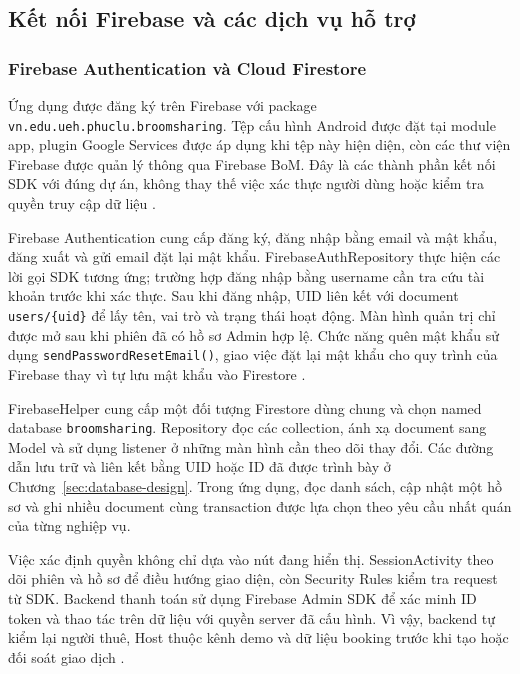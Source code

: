 \subsection{Kết nối Firebase và các dịch vụ hỗ trợ}
\label{sec:firebase-and-services}

\subsubsection{Firebase Authentication và Cloud Firestore}
Ứng dụng được đăng ký trên Firebase với package \texttt{vn.edu.ueh.phuclu.broomsharing}. Tệp cấu hình Android được đặt tại module app, plugin Google Services được áp dụng khi tệp này hiện diện, còn các thư viện Firebase được quản lý thông qua Firebase BoM. Đây là các thành phần kết nối SDK với đúng dự án, không thay thế việc xác thực người dùng hoặc kiểm tra quyền truy cập dữ liệu \parencite{firebase_android}.

Firebase Authentication cung cấp đăng ký, đăng nhập bằng email và mật khẩu, đăng xuất và gửi email đặt lại mật khẩu. FirebaseAuthRepository thực hiện các lời gọi SDK tương ứng; trường hợp đăng nhập bằng username cần tra cứu tài khoản trước khi xác thực. Sau khi đăng nhập, UID liên kết với document \texttt{users/\{uid\}} để lấy tên, vai trò và trạng thái hoạt động. Màn hình quản trị chỉ được mở sau khi phiên đã có hồ sơ Admin hợp lệ. Chức năng quên mật khẩu sử dụng \texttt{sendPasswordResetEmail()}, giao việc đặt lại mật khẩu cho quy trình của Firebase thay vì tự lưu mật khẩu vào Firestore \parencite{firebase_auth_users}.

FirebaseHelper cung cấp một đối tượng Firestore dùng chung và chọn named database \texttt{broomsharing}. Repository đọc các collection, ánh xạ document sang Model và sử dụng listener ở những màn hình cần theo dõi thay đổi. Các đường dẫn lưu trữ và liên kết bằng UID hoặc ID đã được trình bày ở Chương~\ref{sec:database-design}. Trong ứng dụng, đọc danh sách, cập nhật một hồ sơ và ghi nhiều document cùng transaction được lựa chọn theo yêu cầu nhất quán của từng nghiệp vụ.

Việc xác định quyền không chỉ dựa vào nút đang hiển thị. SessionActivity theo dõi phiên và hồ sơ để điều hướng giao diện, còn Security Rules kiểm tra request từ SDK. Backend thanh toán sử dụng Firebase Admin SDK để xác minh ID token và thao tác trên dữ liệu với quyền server đã cấu hình. Vì vậy, backend tự kiểm lại người thuê, Host thuộc kênh demo và dữ liệu booking trước khi tạo hoặc đối soát giao dịch \parencite{firebase_admin_token}.

